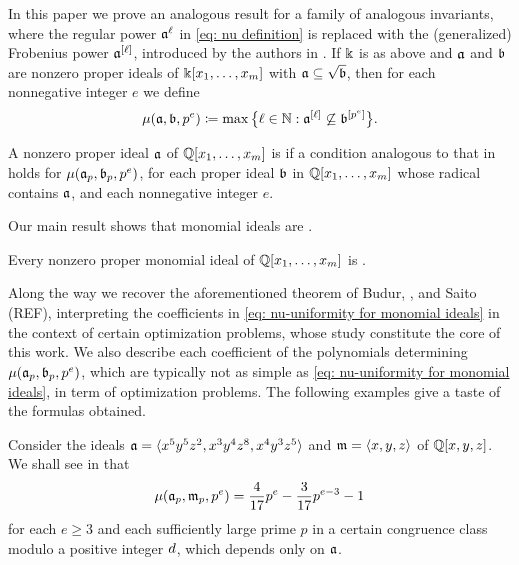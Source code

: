 \documentclass{amsart}
\begin{document}
In this paper we prove an analogous result for a family of analogous invariants, where the regular power $\mathfrak{a}^\ell$ in \eqref{eq: nu definition} is replaced with the (generalized) Frobenius power $\mathfrak{a}^{[\ell]}$, introduced by the authors in \cite{hernandez+etal.frobenius_powers}.
If $\Bbbk$ is as above and $\mathfrak{a}$ and $\mathfrak{b}$ are nonzero proper ideals of $\Bbbk[x_1, \ldots, x_m]$ with $\mathfrak{a} \subseteq \sqrt{\mathfrak{b}}$, then for each nonnegative integer $e$ we define
\[\mu(\mathfrak{a},\mathfrak{b},p^e) \coloneqq \max\big\{\ell\in \mathbb{N} : \mathfrak{a}^{[\ell]} \not\subseteq \mathfrak{b}^{[p^e]}\big\}.\]

\begin{definition}
   \label{defn: muCool}
   A nonzero proper ideal $\mathfrak{a}$ of $\mathbb{Q}[x_1,\ldots,x_m]$ is \emph{\muCool} if a condition analogous to that in  holds for $\mu(\mathfrak{a}_p,\mathfrak{b}_p,p^e)$, for each proper ideal $\mathfrak{b}$ in $\mathbb{Q}[x_1,\ldots,x_m]$ whose radical contains $\mathfrak{a}$, and each nonnegative integer $e$.
\end{definition}

Our main result shows that monomial ideals are \muCool.
\begin{thmintro}[(REF)]
   \label{main theorem}
   Every nonzero proper monomial ideal of $\mathbb{Q}[x_1,\ldots,x_m]$ is \muCool.
\end{thmintro}
Along the way we recover the aforementioned theorem of Budur, \mustata, and Saito (REF), interpreting the coefficients in \eqref{eq: nu-uniformity for monomial ideals} in the context of certain optimization problems, whose study constitute the core of this work. 
We also describe each coefficient of the polynomials determining $\mu(\mathfrak{a}_p,\mathfrak{b}_p,p^e)$, which are typically not as simple as \eqref{eq: nu-uniformity for monomial ideals}, in term of optimization problems.
The following examples give a taste of the formulas obtained.

\begin{example}
   Consider the ideals $\mathfrak{a} = \langle x^5 y^5 z^2, x^3 y^4 z^8, x^4 y^3 z^5 \rangle$ and $\mathfrak{m} = \langle x,y,z \rangle$ of $\mathbb{Q}[x,y,z]$.
   We shall see in  that
   \[
      \mu(\mathfrak{a}_p,\mathfrak{m}_p,p^e) = \frac{4}{17}p^e - \frac{3}{17}p^{e-3}  - 1
    \]
    for each $e\ge 3$ and each sufficiently large prime $p$ in a certain congruence class modulo a positive integer $d$, which depends only on $\mathfrak{a}$.
\end{example}
\end{document}
